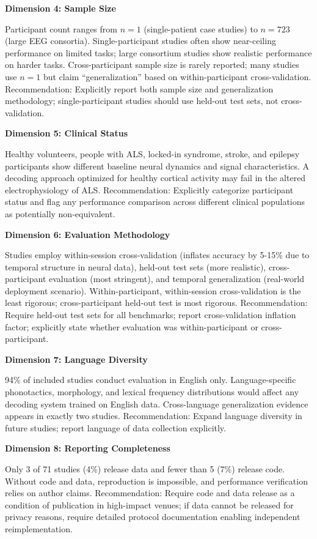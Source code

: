 \textbf{Dimension 4: Sample Size}

Participant count ranges from $n=1$ (single-patient case studies) to $n=723$ (large EEG consortia). Single-participant studies often show near-ceiling performance on limited tasks; large consortium studies show realistic performance on harder tasks. Cross-participant sample size is rarely reported; many studies use $n=1$ but claim ``generalization'' based on within-participant cross-validation. Recommendation: Explicitly report both sample size and generalization methodology; single-participant studies should use held-out test sets, not cross-validation.

\textbf{Dimension 5: Clinical Status}

Healthy volunteers, people with ALS, locked-in syndrome, stroke, and epilepsy participants show different baseline neural dynamics and signal characteristics. A decoding approach optimized for healthy cortical activity may fail in the altered electrophysiology of ALS. Recommendation: Explicitly categorize participant status and flag any performance comparison across different clinical populations as potentially non-equivalent.

\textbf{Dimension 6: Evaluation Methodology}

Studies employ within-session cross-validation (inflates accuracy by 5-15\% due to temporal structure in neural data), held-out test sets (more realistic), cross-participant evaluation (most stringent), and temporal generalization (real-world deployment scenario). Within-participant, within-session cross-validation is the least rigorous; cross-participant held-out test is most rigorous. Recommendation: Require held-out test sets for all benchmarks; report cross-validation inflation factor; explicitly state whether evaluation was within-participant or cross-participant.

\textbf{Dimension 7: Language Diversity}

94\% of included studies conduct evaluation in English only. Language-specific phonotactics, morphology, and lexical frequency distributions would affect any decoding system trained on English data. Cross-language generalization evidence appears in exactly two studies. Recommendation: Expand language diversity in future studies; report language of data collection explicitly.

\textbf{Dimension 8: Reporting Completeness}

Only 3 of 71 studies (4\%) release data and fewer than 5 (7\%) release code. Without code and data, reproduction is impossible, and performance verification relies on author claims. Recommendation: Require code and data release as a condition of publication in high-impact venues; if data cannot be released for privacy reasons, require detailed protocol documentation enabling independent reimplementation.


